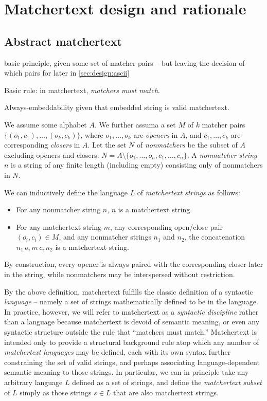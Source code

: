 \section{Matchertext design and rationale}
\label{sec:design}

\subsection{Abstract matchertext}

basic principle, given some set of matcher pairs --
but leaving the decision of which pairs for later in
\cref{sec:design:ascii}

Basic rule: in matchertext, \emph{matchers must match}.

Always-embeddability given that embedded string is valid matchertext.

We assume some alphabet $A$.
We further assuma a set $M$ of $k$ matcher pairs
$\{(o_1,c_1),\dots,(o_k,c_k)\}$,
where $o_1,\dots,o_k$ are \emph{openers} in $A$,
and $c_1,\dots,c_k$ are corresponding \emph{closers} in $A$.
Let the set $N$ of \emph{nonmatchers} be the subset of $A$
excluding openers and closers:
\ie $N = A \setminus \{o_1,\dots,o_n,c_1,\dots,c_n\}$.
A \emph{nonmatcher string} $n$ is a string of any finite length
(including empty)
consisting only of nonmatchers in $N$.


We can inductively define the language $L$ of \emph{matchertext strings}
as follows:
\begin{itemize}
\item	For any nonmatcher string $n$,
	$n$ is a matchertext string.
\item	For any matchertext string $m$,
	any corresponding open/close pair $(o_i,c_i) \in M$,
	and any nonmatcher strings $n_1$ and $n_2$,
	the concatenation $n_1\,o_i\,m\,c_i\,n_2$ is a matchertext string.
\end{itemize}

By construction, every opener is always paired
with the corresponding closer later in the string,
while nonmatchers may be interspersed without restriction.

By the above definition,
matchertext fulfills the classic definition of a syntactic \emph{language} --
namely a set of strings mathematically defined to be in the language.
In practice, however,
we will refer to matchertext as a \emph{syntactic discipline}
rather than a language
because matchertext is devoid of semantic meaning,
or even any syntactic structure outside the rule that ``matchers must match.''
Matchertext is intended only to provide a structural background rule
atop which any number of \emph{matchertext languages} may be defined,
each with its own syntax further constraining the set of valid strings,
and perhaps associating language-dependent semantic meaning to those strings.
In particular, we can in principle take any arbitrary language $L$
defined as a set of strings,
and define the \emph{matchertext subset} of $L$
simply as those strings $s \in L$ that are also matchertext strings.



